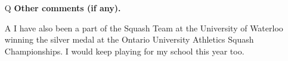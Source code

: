 \documentclass[12pt]{article}
\begin{document}
\begin{itemize}[leftmargin=*]
\item[Q] \textbf{Other comments (if any).}
\item[A] I have also been a part of the Squash Team at the University of Waterloo winning the silver medal at the Ontario University Athletics Squash Championships. I would keep playing for my school this year too.   
\end{itemize}
\end{document}
